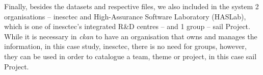 Finally, besides the datasets and respective files, we also included in the system 2 organisations -- \gls{inesctec} and High-Assurance Software Laboratory (HASLab), which is one of \gls{inesctec}'s integrated R\&D centres -- and 1 group -- \gls{sail} Project. While it is necessary in \textit{\gls{ckan}} to have an organisation that owns and manages the information, in this case study, \gls{inesctec}, there is no need for groups, however, they can be used in order to catalogue a team, theme or project, in this case \gls{sail} Project.